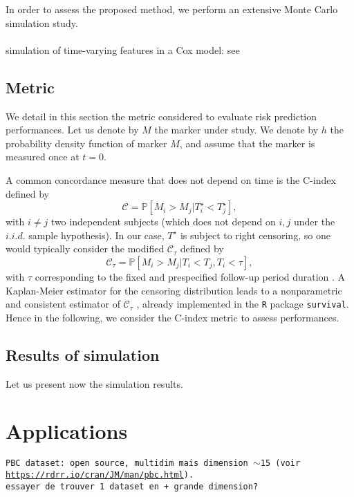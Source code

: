 \documentclass[11pt]{article}
\newcommand{\cC}{\mathcal C}
\renewcommand{\P}{\mathds P}
\begin{document}
In order to assess the proposed method, we perform an extensive Monte Carlo simulation study. \\
\\
simulation of time-varying features in a Cox model: see \citet{therneau2017using}


\subsection{Metric}
\label{sec:Metrics}

We detail in this section the metric considered to evaluate risk prediction performances. Let us denote by $M$ the marker under study. We denote by $h$ the probability density function of marker $M$, and assume that the marker is measured once at $t = 0$.

A common concordance measure that does not depend on time is the C-index~\citep{harrell1996tutorial} defined by
\begin{equation*}
  \cC =\P[M_i > M_j | T^\star_i < T^\star_j],
\end{equation*}
with $i \neq j$ two independent subjects (which does not depend on $i, j$ under the $i.i.d.$ sample hypothesis). 
In our case,  $T^\star$ is subject to right censoring, so one would typically consider the modified $\cC_\tau$ defined by
\begin{equation*}
  \cC_\tau =\P[M_i > M_j | T_i < T_j , T_i < \tau],
\end{equation*}
with $\tau$ corresponding to the fixed and prespecified follow-up period duration \citep{heagerty2005survival}. A Kaplan-Meier estimator for the censoring distribution leads to a nonparametric and consistent estimator of $\cC_\tau$ \citep{uno2011c}, already implemented in the \texttt{R} package \texttt{survival}.
Hence in the following, we consider the C-index metric to assess performances.


\subsection{Results of simulation}
\label{Results}
Let us present now the simulation results.


\section{Applications}
\label{sec:application}

\texttt{PBC dataset: open source, multidim mais dimension $\sim$15 (voir \url{https://rdrr.io/cran/JM/man/pbc.html}). \\ 
essayer de trouver 1 dataset en + grande dimension?}
\end{document}
